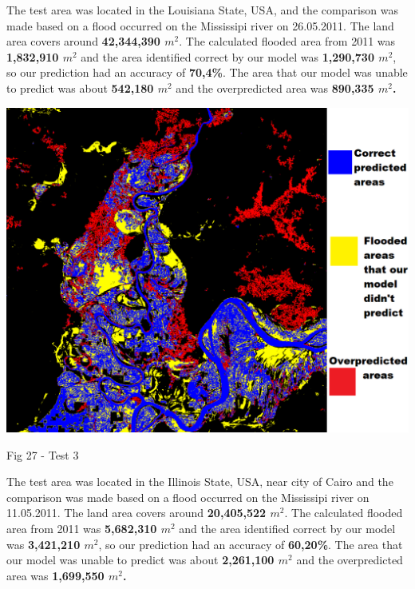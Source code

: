 \documentclass[12pt, a4paper]{report}
\begin{document}
The test area was located in the Louisiana State, USA, and the comparison was made based on a flood occurred on the Mississipi river on 26.05.2011. The land area covers around \textbf{42,344,390 $m^2$}. The calculated flooded area from 2011 was \textbf{1,832,910 $m^2$} and the area identified correct by our model was \textbf{1,290,730 $m^2$}, so our prediction had an accuracy of \textbf{70,4\%}. The area that our model was unable to predict was about \textbf{542,180 $m^2$} and the overpredicted area was \textbf{890,335 $m^2$.}

\newpage

\bigskip
\includegraphics[scale=0.6, center]{test_3.png}
\begin{center}
Fig 27 - Test 3 
\end{center}
\par 

The test area was located in the Illinois State, USA, near city of Cairo and the comparison was made based on a flood occurred on the Mississipi river on 11.05.2011. The land area covers around \textbf{20,405,522 $m^2$}. The calculated flooded area from 2011 was \textbf{5,682,310 $m^2$} and the area identified correct by our model was \textbf{3,421,210 $m^2$}, so our prediction had an accuracy of \textbf{60,20\%}. The area that our model was unable to predict was about \textbf{2,261,100 $m^2$} and the overpredicted area was \textbf{1,699,550 $m^2$.}

\newpage
\end{document}
